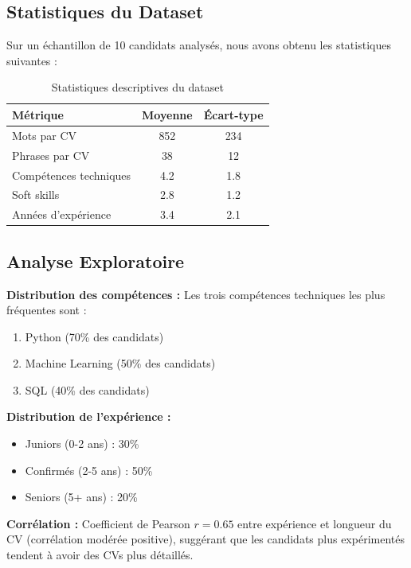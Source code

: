 \documentclass{rapportECL}
\begin{document}
\subsection{Statistiques du Dataset}

Sur un échantillon de 10 candidats analysés, nous avons obtenu les statistiques suivantes :

\begin{table}[H]
\centering
\begin{tabular}{lcc}
\toprule
\textbf{Métrique} & \textbf{Moyenne} & \textbf{Écart-type} \\
\midrule
Mots par CV & 852 & 234 \\
Phrases par CV & 38 & 12 \\
Compétences techniques & 4.2 & 1.8 \\
Soft skills & 2.8 & 1.2 \\
Années d'expérience & 3.4 & 2.1 \\
\bottomrule
\end{tabular}
\caption{Statistiques descriptives du dataset}
\label{tab:dataset_stats}
\end{table}

\subsection{Analyse Exploratoire}

\textbf{Distribution des compétences :} Les trois compétences techniques les plus fréquentes sont :
\begin{enumerate}[leftmargin=*]
    \item Python (70\% des candidats)
    \item Machine Learning (50\% des candidats)
    \item SQL (40\% des candidats)
\end{enumerate}

\textbf{Distribution de l'expérience :} 
\begin{itemize}[leftmargin=*]
    \item Juniors (0-2 ans) : 30\%
    \item Confirmés (2-5 ans) : 50\%
    \item Seniors (5+ ans) : 20\%
\end{itemize}

\textbf{Corrélation :} Coefficient de Pearson $r=0.65$ entre expérience et longueur du CV (corrélation modérée positive), suggérant que les candidats plus expérimentés tendent à avoir des CVs plus détaillés.
\end{document}

